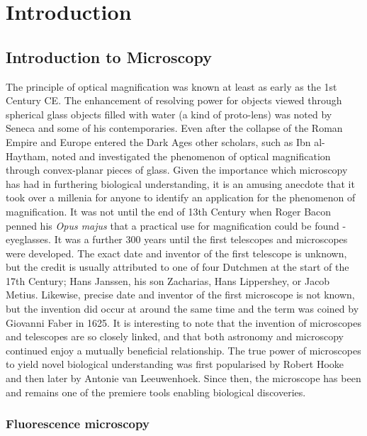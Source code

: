 \chapter{Introduction}

\section{Introduction to Microscopy}
\label{sec:microscopy}

The principle of optical magnification was known at least as early as the 1st 
Century CE. The enhancement of resolving power for objects viewed through 
spherical glass objects filled with water (a kind of proto-lens) was noted by 
Seneca and some of his contemporaries\cite{seneca1971naturales}. Even after 
the collapse of the Roman Empire and Europe entered the Dark Ages other 
scholars, such as Ibn al-Haytham, noted and investigated the phenomenon of 
optical magnification through convex-planar pieces of 
glass\cite{nasr1968science}. Given the importance which microscopy has had in 
furthering biological understanding, it is an amusing anecdote that it took 
over a millenia for anyone to identify an application for the phenomenon of 
magnification. It was not until the end of 13th Century  when Roger Bacon 
penned his \textit{Opus majus} that a practical use for magnification could 
be found - eyeglasses. It was a further 300 years until the first telescopes 
and microscopes were developed. The exact date and inventor of the first 
telescope is unknown, but the credit is usually attributed to one of four 
Dutchmen at the start of the 17th Century; Hans Janssen, his son Zacharias, 
Hans Lippershey, or Jacob Metius. Likewise, precise date and inventor of the 
first microscope is not known, but the invention did occur at around the same 
time and the term was coined by Giovanni Faber in 
1625\cite{bardell2004invention}. It is interesting to note that the invention 
of microscopes and telescopes are so closely linked, and that both astronomy 
and microscopy continued enjoy a mutually beneficial relationship. The true 
power of microscopes to yield novel biological understanding was first 
popularised by Robert Hooke and then later by Antonie van 
Leeuwenhoek\cite{hooke1665micrographia, chung2017pioneers}. Since then, the 
microscope has been and remains one of the premiere tools enabling biological 
discoveries.

\subsection{Fluorescence microscopy}
\label{subsec:fluorescence}

